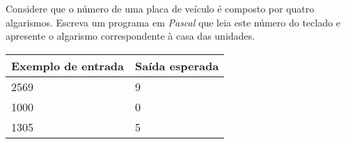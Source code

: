 \item Considere que o número de uma placa de veículo é composto por quatro 
algarismos. Escreva um programa em \emph{Pascal} que leia este número  do
teclado e apresente o algarismo correspondente à casa das unidades.

\begin{center}
\begin{tabular}{|l|l|} \hline
Exemplo de entrada & Saída esperada \\ \hline
2569                & 9               \\ \hline
1000                & 0               \\ \hline
1305                & 5               \\ \hline
\end{tabular}
\end{center}